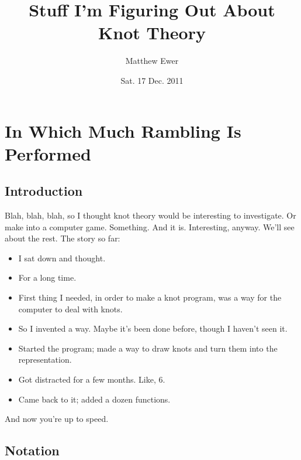\documentclass[twoside]{report}
\title{Stuff I'm Figuring Out About Knot Theory}
\author{Matthew Ewer}
\date{Sat. 17 Dec. 2011}
\begin{document}
\maketitle
\tableofcontents

\chapter{In Which Much Rambling Is Performed}

\section{Introduction}

Blah, blah, blah, so I thought knot theory would be interesting to investigate.  Or make into a computer game.  Something.  And it is.  Interesting, anyway.  We'll see about the rest.  The story so far:
\begin{itemize}
\item I sat down and thought.
\item For a long time.
\item First thing I needed, in order to make a knot program, was a way for the computer to deal with knots.
\item So I invented a way.  Maybe it's been done before, though I haven't seen it.
\item Started the program; made a way to draw knots and turn them into the representation.
\item Got distracted for a few months.  Like, 6.
\item Came back to it; added a dozen functions.
\end{itemize}
And now you're up to speed.

\section{Notation}
\end{document}
